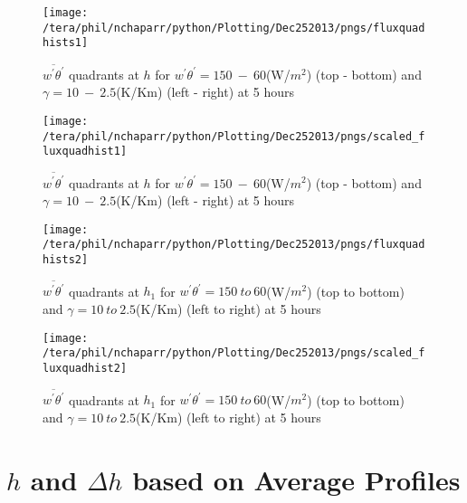 \begin{figure}[htbp]
%
\centering
 \texttt{[image: /tera/phil/nchaparr/python/Plotting/Dec252013/pngs/fluxquadhists1]}                 

\caption{ $\overline{w^{'}\theta^{'}}$ quadrants at $h$ for $w^{'}\theta^{'} = 150 \ - \ 60$(W/$m^{2}$) (top - bottom) and $\gamma = 10 \ - \  2.5$(K/Km) (left - right) at 5 hours}

\label{fig:fluxquadsh}

\end{figure}

\begin{figure}[htbp]
%
\centering
 \texttt{[image: /tera/phil/nchaparr/python/Plotting/Dec252013/pngs/scaled\_fluxquadhist1]}                 

\caption{ $\overline{w^{'}\theta^{'}}$ quadrants at $h$ for $w^{'}\theta^{'} = 150 \ - \ 60$(W/$m^{2}$) (top - bottom) and $\gamma = 10 \ - \  2.5$(K/Km) (left - right) at 5 hours}

\label{fig:fluxquadsh}

\end{figure}


\begin{figure}[htbp]
%
\caption{ $\overline{w^{'}\theta^{'}}$ quadrants at $h_{1}$ for $w^{'}\theta^{'} = 150 \ to \ 60$(W/$m^{2}$) (top to bottom) and $\gamma = 10 \ to \ 2.5$(K/Km) (left to right) at 5 hours}
\centering
 \texttt{[image: /tera/phil/nchaparr/python/Plotting/Dec252013/pngs/fluxquadhists2]}                 


\label{fig:fluxquadsh1}
\end{figure}

\begin{figure}[htbp]
%
\caption{ $\overline{w^{'}\theta^{'}}$ quadrants at $h_{1}$ for $w^{'}\theta^{'} = 150 \ to \ 60$(W/$m^{2}$) (top to bottom) and $\gamma = 10 \ to \ 2.5$(K/Km) (left to right) at 5 hours}
\centering
 \texttt{[image: /tera/phil/nchaparr/python/Plotting/Dec252013/pngs/scaled\_fluxquadhist2]}                 


\label{fig:fluxquadsh1}
\end{figure}

\clearpage

\section{$h$ and  $\Delta h$ based on Average Profiles}
\label{sec:hdeltahavprofs}

